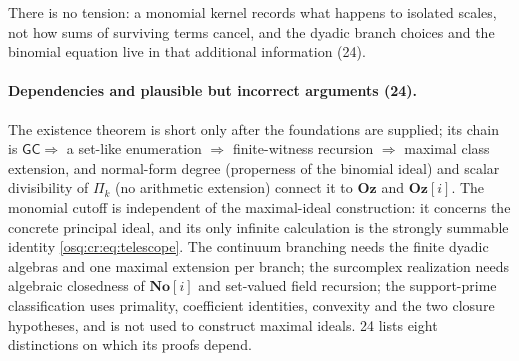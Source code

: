 \documentclass[11pt,letterpaper]{article}
\numberwithin{equation}{section}
\theoremstyle{definition}
\theoremstyle{remark}
\theoremstyle{plain}
\newcommand{\No}{\mathbf{No}}
\newcommand{\Oz}{\mathbf{Oz}}
\newcommand{\SC}{\No[i]}
\newcommand{\GOz}{\Oz[i]}
\begin{document}
There is no tension: a monomial kernel records what happens to isolated scales, not how sums of surviving terms cancel, and the dyadic branch choices
and the binomial equation live in that additional information (24).

\paragraph{Dependencies and plausible but incorrect arguments (24).} The existence theorem is short only after the foundations are supplied; its chain is
$\mathsf{GC}\Rightarrow$ a set-like enumeration $\Rightarrow$ finite-witness recursion $\Rightarrow$ maximal class extension, and normal-form degree
(properness of the binomial ideal) and scalar divisibility of $\Pi_k$ (no arithmetic extension) connect it to $\Oz$ and $\GOz$. The monomial cutoff is
independent of the maximal-ideal construction: it concerns the concrete principal ideal, and its only infinite calculation is the strongly summable
identity \eqref{osq:cr:eq:telescope}. The continuum branching needs the finite dyadic algebras and one maximal extension per branch; the surcomplex
realization needs algebraic closedness of $\SC$ and set-valued field recursion; the support-prime classification uses primality, coefficient identities,
convexity and the two closure hypotheses, and is not used to construct maximal ideals. 24 lists eight distinctions on which its proofs depend.
\end{document}
